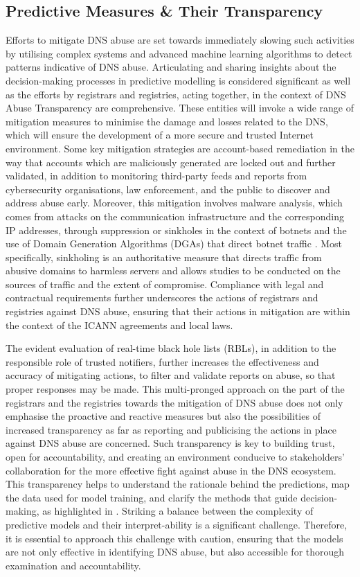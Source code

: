 \subsection{Predictive Measures \& Their Transparency}

Efforts to mitigate DNS abuse are set towards immediately slowing such activities by utilising complex systems and advanced machine learning algorithms to detect patterns indicative of DNS abuse. Articulating and sharing insights about the decision-making processes in predictive modelling is considered significant as well as the efforts by registrars and registries, acting together, in the context of DNS Abuse Transparency are comprehensive. These entities will invoke a wide range of mitigation measures to minimise the damage and losses related to the DNS, which will ensure the development of a more secure and trusted Internet environment. Some key mitigation strategies are account-based remediation in the way that accounts which are maliciously generated are locked out and further validated, in addition to monitoring third-party feeds and reports from cybersecurity organisations, law enforcement, and the public to discover and address abuse early. Moreover, this mitigation involves malware analysis, which comes from attacks on the communication infrastructure and the corresponding IP addresses, through suppression or sinkholes in the context of botnets and the use of Domain Generation Algorithms (DGAs) that direct botnet traffic \cite{ M3AAWG2024}. Most specifically, sinkholing is an authoritative measure that directs traffic from abusive domains to harmless servers and allows studies to be conducted on the sources of traffic and the extent of compromise. Compliance with legal and contractual requirements further underscores the actions of registrars and registries against DNS abuse, ensuring that their actions in mitigation are within the context of the ICANN agreements and local laws. 

The evident evaluation of real-time black hole lists (RBLs), in addition to the responsible role of trusted notifiers, further increases the effectiveness and accuracy of mitigating actions, to filter and validate reports on abuse, so that proper responses may be made. This multi-pronged approach on the part of the registrars and the registries towards the mitigation of DNS abuse does not only emphasise the proactive and reactive measures but also the possibilities of increased transparency as far as reporting and publicising the actions in place against DNS abuse are concerned. Such transparency is key to building trust, open for accountability, and creating an environment conducive to stakeholders' collaboration for the more effective fight against abuse in the DNS ecosystem. This transparency helps to understand the rationale behind the predictions, map the data used for model training, and clarify the methods that guide decision-making, as highlighted in \cite{hussain2022software}. Striking a balance between the complexity of predictive models and their interpret-ability is a significant challenge. Therefore, it is essential to approach this challenge with caution, ensuring that the models are not only effective in identifying DNS abuse, but also accessible for thorough examination and accountability.


